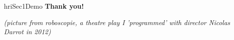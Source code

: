 \documentclass[xcolor=table]{beamer}
\begin{document}

{
\begin{frame}[plain]

    \begin{columns}
        \begin{column}{0.6\linewidth}
        \end{column}
        \begin{column}{0.4\linewidth}

    \vspace{6em}
\begin{beamercolorbox}[wd=\linewidth,ht=6ex,dp=0.7ex]{hriSec1Demo}
    \textbf{Thank you!}
\end{beamercolorbox}
    \vspace{12em}
    {\scriptsize
            \emph{(picture from \emph{roboscopie}, a theatre play I 'programmed' with director Nicolas Darrot in
            2012)}
    }
        \end{column}
    \end{columns}
\end{frame}
}
\end{document}
